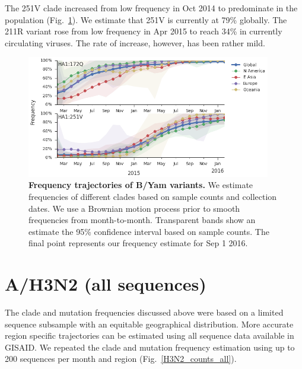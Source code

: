 \documentclass[11pt,oneside,letterpaper]{article}
\begin{document}
\pagebreak

The 251V clade increased from low frequency in Oct 2014 to predominate in the population (Fig.\ \ref{Yam_mutations}). We estimate that 251V is currently at 79\% globally. The 211R variant rose from low frequency in Apr 2015 to reach 34\% in currently circulating viruses. The rate of increase, however, has been rather mild.

\begin{figure}[H]
	\centering
	\includegraphics[width=0.95\textwidth]{../figures/feb-2016/Yam_mutations.png}
	\caption{\textbf{Frequency trajectories of B/Yam variants.}
	We estimate frequencies of different clades based on sample counts and collection dates.
	We use a Brownian motion process prior to smooth frequencies from month-to-month.
	Transparent bands show an estimate the 95\% confidence interval based on sample counts.
	The final point represents our frequency estimate for Sep 1 2016.
	}
	\label{Yam_mutations}
\end{figure}

\clearpage
\pagebreak

\section*{A/H3N2 (all sequences)}

The clade and mutation frequencies discussed above were based on a limited sequence subsample with an equitable geographical distribution. More accurate region specific trajectories can be estimated using all sequence data available in GISAID. We repeated the clade and mutation frequency estimation using up to 200 sequences per month and region (Fig.\ \ref{H3N2_counts_all}).
\end{document}

